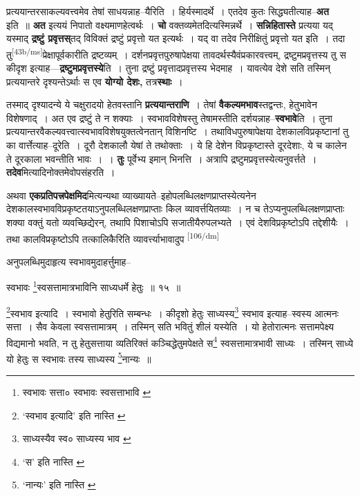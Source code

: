 \documentclass[article,12pt,a4paper]{memoir}
\begin{document}
	  \pstart प्रत्ययान्तरसाकल्यवत्त्वमेव तेषां साधयन्नाह--यैरिति । हिर्यस्मादर्थे । एतदेव कुतः सिद्ध्यतीत्याह--\textbf{अत} इति ॥ \textbf{अत} इत्ययं निपातो वक्ष्यमाणहेत्वर्थः । \textbf{चो} वक्तव्यमेतदित्यस्मिन्नर्थे । \textbf{सन्निहितास्ते} प्रत्यया यद् यस्माद् \textbf{द्रष्टुं प्रवृत्तस्}तद् विविक्तं द्रष्टुं प्रवृत्तो यत इत्यर्थः । यद् वा तदेव निरीक्षितुं प्रवृत्तो यत इति । तदा तु\leavevmode\textsuperscript{\rmlatinfont\tiny [43b/ms]}प्रेक्षापूर्वकारीति द्रष्टव्यम् । दर्शनप्रवृत्तपुरुषापेक्षया तावदर्थस्यैवंप्रकारवत्त्वम्, द्रष्टुमप्रवृत्तस्य तु स कीदृश इत्याह—\textbf{द्रष्टुमप्रवृत्तस्ये}ति । तुना द्रष्टुं प्रवृत्तादप्रवृत्तस्य भेदमाह । यावत्येव देशे सति तस्मिन् प्रत्ययान्तरे दृश्यन्तेऽर्थाः स एव \textbf{योग्यो देशः,} तत्र\textbf{स्थाः} ।
	\pend
      

	  \pstart तस्माद् दृश्यादन्ये ये चक्षुरादयो हेतवस्तानि \textbf{प्रत्ययान्तराणि} । तेषां \textbf{वैकल्यमभाव}स्तद्वन्तः, हेतुभावेन विशेषणाद् । अत एव द्रष्टुं ते न शक्याः । स्वभावविशेषस्तु तेषामस्तीति दर्शयन्नाह--\textbf{स्वभावे}ति । तुना प्रत्ययान्तरवैकल्यवत्त्वात्स्वभावविशेषयुक्तत्वेनतान् विशिनष्टि । तथाविधपुरुषापेक्षया देशकालविप्रकृष्टानां तु का वार्त्तेत्याह--दूरेति । दूरौ देशकालौ येषां ते तथोक्ताः । ये हि देशेन विप्रकृष्टास्ते दूरदेशाः, ये च कालेन ते दूरकाला भवन्तीति भावः । । \textbf{तुः} पूर्वेभ्य इमान् भिनत्ति । अत्रापि द्रष्टुमप्रवृत्तस्येत्यनुवर्त्तते । \textbf{तदेव}मित्यादिनोक्तमेवोपसंहरति ।
	\pend
      

	  \pstart अथवा \textbf{एकप्रतिपत्त्रपेक्षमिद}मित्यन्यथा व्याख्यायते--इहोपलब्धिलक्षणप्राप्तस्येत्यनेन देशकालस्वभावविप्रकृष्टतयाऽनुपलब्धिलक्षणप्राप्ताः किल व्यावर्त्तयितव्याः । न च तेऽप्यनुपलब्धिलक्षणप्राप्ताः शक्या वक्तुं यतो व्यवच्छिद्येरन्, तथापि पिशाचोऽपि सजातीयैरुपलभ्यते । एवं देशविप्रकृष्टोऽपि तद्देशीयैः । तथा कालविप्रकृष्टोऽपि तत्कालिकैरिति व्यावर्त्त्याभावादुप \leavevmode\textsuperscript{\rmlatinfont\tiny [106/dm]} 
	  
	अनुपलब्धिमुदाहृत्य स्वभावमुदाहर्त्तुमाह-- 
	  
	स्वभावः \footnote{स्वभावः सत्ता० \cite{dp-msC} स्वभावः स्वसत्ताभावि \cite{dp-edE}}स्वसत्तामात्रभाविनि साध्यधर्मे हेतुः ॥ १५ ॥ 
	  
	\footnote{‘स्वभाव इत्यादि’ इति नास्ति \cite{dp-msA} \cite{dp-edP} \cite{dp-edH} \cite{dp-edE} \cite{dp-edN}}स्वभाव इत्यादि । स्वभावो हेतुरिति सम्बन्धः । कीदृशो हेतुः साध्यस्य\footnote{साध्यस्यैव स्व० \cite{dp-msA} \cite{dp-edP} \cite{dp-edH} \cite{dp-edE} \cite{dp-edN} साध्यस्य भाव \cite{dp-msB}} स्वभाव इत्याह--स्वस्य आत्मनः सत्ता । सैव केवला स्वसत्तामात्रम् । तस्मिन् सति भवितुं शीलं यस्येति । यो हेतोरात्मनः सत्तामपेक्ष्य विद्यमानो भवति, न तु हेतुसत्ताया व्यतिरिक्तं कञ्चिद्धेतुमपेक्षते स\footnote{‘स’ इति नास्ति \cite{dp-msA}} स्वसत्तामात्रभावी साध्यः । तस्मिन् साध्ये यो हेतुः स स्वभावः तस्य साध्यस्य \footnote{‘नान्यः’ इति नास्ति \cite{dp-msC}}नान्यः ॥ 
	  
\end{document}
